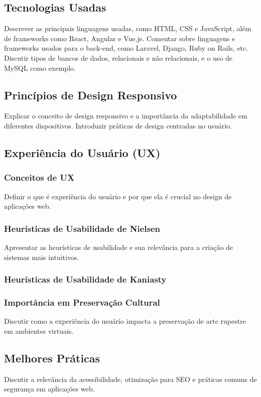 \subsection{Tecnologias Usadas}
Descrever as principais linguagens usadas, como HTML, CSS e JavaScript, além de frameworks como React, Angular e Vue.js. Comentar sobre linguagens e frameworks usados para o back-end, como Laravel, Django, Ruby on Rails, etc. Discutir tipos de bancos de dados, relacionais e não relacionais, e o uso de MySQL como exemplo.

\subsection{Princípios de Design Responsivo}
Explicar o conceito de design responsivo e a importância da adaptabilidade em diferentes dispositivos. Introduzir práticas de design centradas no usuário.

\subsection{Experiência do Usuário (UX)}
\subsubsection{Conceitos de UX}
Definir o que é experiência do usuário e por que ela é crucial no design de aplicações web.

\subsubsection{Heurísticas de Usabilidade de Nielsen}
Apresentar as heurísticas de usabilidade e sua relevância para a criação de sistemas mais intuitivos.
\subsubsection{Heurísticas de Usabilidade de Kaniasty}


\subsubsection{Importância em Preservação Cultural}
Discutir como a experiência do usuário impacta a preservação de arte rupestre em ambientes virtuais.

\subsection{Melhores Práticas}
Discutir a relevância da acessibilidade, otimização para SEO e práticas comuns de segurança em aplicações web.

